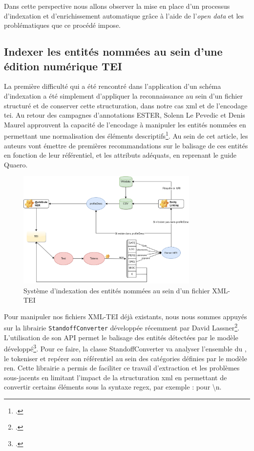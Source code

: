 	 Dans cette perspective nous allons observer la mise en place d'un processus d'indexation et d'enrichissement automatique grâce à l'aide de l'\textit{open data} et les problématiques que ce procédé impose.
	
	\subsection{Indexer les entités nommées au sein d'une édition numérique TEI}
	
	La première difficulté qui a été rencontré dans l'application d'un schéma d'indexation a été simplement d'appliquer la reconnaissance au sein d'un fichier structuré et de conserver cette structuration, dans notre cas \gls{xml} et de l'encodage \gls{tei}. Au retour des campagnes d'annotations ESTER, Solenn Le Pevedic et Denis Maurel approuvent la capacité de l'encodage à manipuler les entités nommées en permettant une normalisation des éléments descriptifs\footcite{lepevedicRetourAnnotationsEntites2016a}. Au sein de cet article, les auteurs vont émettre de premières recommandations sur le balisage de ces entités en fonction de leur référentiel, et les attributs adéquats, en reprenant le guide Quaero.
	
	\begin{figure}[h!]
	    \centering
	    \includegraphics[width=0.8\textwidth]{annexes/schema/ner_index.png}
	    \caption{Système d'indexation des entités nommées au sein d'un fichier XML-TEI}
	    \label{fig:ner_index}
	\end{figure}
	
	Pour manipuler nos fichiers XML-TEI déjà existants, nous nous sommes appuyés sur la librairie \texttt{StandoffConverter} développée récemment par David Lassner\footcite{lassnerStandoffconverter2021}. L'utilisation de son \gls{API} permet le balisage des entités détectées par le modèle développé\footcite[Le script est visible au chemin suivant : TEI\_tranformation/src/enrichment/nlp.py \textit{in}][]{humeauTeiTransformation2022}. Pour ce faire, la classe StandoffConverter va analyser l'ensemble du , le tokeniser et repérer son référentiel au sein des catégories définies par le modèle \gls{ren}. Cette librairie a permis de faciliter ce travail d'extraction et les problèmes sous-jacents en limitant l'impact de la structuration \gls{xml} en permettant de convertir certains éléments sous la syntaxe \gls{regex}, par exemple :  pour \textbackslash n.
	
